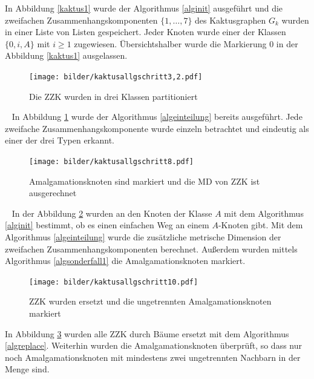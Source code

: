 \begin{bsp}
\newpage
In Abbildung \ref{kaktus1} wurde der Algorithmus \ref{alginit} ausgeführt und die zweifachen Zusammenhangskomponenten $\{1, \ldots, 7\}$ des Kaktusgraphen $G_k$ wurden in einer Liste von Listen gespeichert. Jeder Knoten wurde einer der Klassen $\{0,i,A\}$ mit $i \geq 1$ zugewiesen. Übersichtshalber wurde die Markierung $0$ in der Abbildung \ref{kaktus1} ausgelassen.
\vspace{-3mm} 	   	 
 	   	 \begin{figure}[h!]
		\centering
 		 \texttt{[image: bilder/kaktusallgschritt3,2.pdf]}
   \caption{Die ZZK wurden in drei Klassen partitioniert}
      \label{kaktus1.2}
  	 \end{figure}
\vspace{-3mm}
  	 ~\linebreak
In Abbildung \ref{kaktus1.2} wurde der Algorithmus \ref{algeinteilung} bereits ausgeführt. Jede zweifache Zusammenhangskomponente wurde einzeln betrachtet und eindeutig als einer der drei Typen erkannt.\\
\vspace{-6mm}
  	   	\begin{figure}[h!]
		\centering
 		 \texttt{[image: bilder/kaktusallgschritt8.pdf]}
   \caption{Amalgamationsknoten sind markiert und die MD von ZZK ist ausgerechnet}
\label{kaktus2}  	
  	 \end{figure}
  	 \vspace{-3mm}
~\linebreak
In der Abbildung \ref{kaktus2} wurden an den Knoten der Klasse $A$ mit dem Algorithmus \ref{alginit} bestimmt, ob es einen einfachen Weg an einem $A$-Knoten gibt. Mit dem Algorithmus \ref{algeinteilung} wurde die zusätzliche metrische Dimension der zweifachen Zusammenhangskomponenten berechnet. Außerdem wurden mittels Algorithmus \ref{algsonderfall1} die Amalgamationsknoten markiert.
\vspace{-3mm}
  	   	 \begin{figure}[h!]
		\centering
 		 \texttt{[image: bilder/kaktusallgschritt10.pdf]}
   \caption{ZZK wurden ersetzt und die ungetrennten Amalgamationsknoten markiert}
   \label{kaktus4}
  	 \end{figure}
\newpage In Abbildung \ref{kaktus4} wurden alle ZZK durch Bäume ersetzt mit dem Algorithmus \ref{algreplace}. Weiterhin wurden die Amalgamationsknoten überprüft, so dass nur noch Amalgamationsknoten mit mindestens zwei ungetrennten Nachbarn in der Menge sind.\newline
\vspace{-1mm}

\end{bsp}
